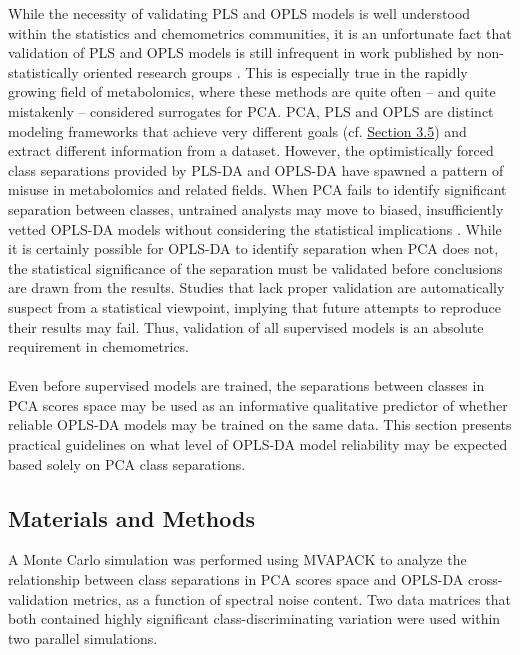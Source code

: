 \begin{doublespace}
While the necessity of validating PLS and OPLS models is well understood
within the statistics and chemometrics communities, it is an unfortunate fact
that validation of PLS and OPLS models is still infrequent in work published
by non-statistically oriented research groups \cite{brereton:jchemo2014b}.
This is especially true in the rapidly growing field of metabolomics, where
these methods are quite often -- and quite mistakenly -- considered surrogates
for PCA. PCA, PLS and OPLS are distinct modeling frameworks that achieve very
different goals (cf. \hyperlink{section.3.5}{Section 3.5}) and extract
different information from a dataset. However, the optimistically forced
class separations provided by PLS-DA and OPLS-DA have spawned a pattern of
misuse in metabolomics and related fields. When PCA fails to identify
significant separation between classes, untrained analysts may move to
biased, insufficiently vetted OPLS-DA models without considering the
statistical implications \cite{aksenov:anchem2014,mclaughlin:anchem2014}.
While it is certainly possible for OPLS-DA to identify separation when PCA
does not, the statistical significance of the separation must be validated
before conclusions are drawn from the results. Studies that lack proper
validation are automatically suspect from a statistical viewpoint, implying
that future attempts to reproduce their results may fail. Thus, validation
of all supervised models is an absolute requirement in chemometrics.
\\\\
Even before supervised models are trained, the separations between classes in
PCA scores space may be used as an informative qualitative predictor of
whether reliable OPLS-DA models may be trained on the same data. This section
presents practical guidelines on what level of OPLS-DA model reliability may
be expected based solely on PCA class separations.
\end{doublespace}

\subsection{Materials and Methods}

\begin{doublespace}
A Monte Carlo simulation was performed using MVAPACK \cite{worley:acscb2014}
to analyze the relationship between class separations in PCA scores space and
OPLS-DA cross-validation metrics, as a function of spectral noise content.
Two data matrices that both contained highly significant class-discriminating
variation were used within two parallel simulations.
\end{doublespace}

